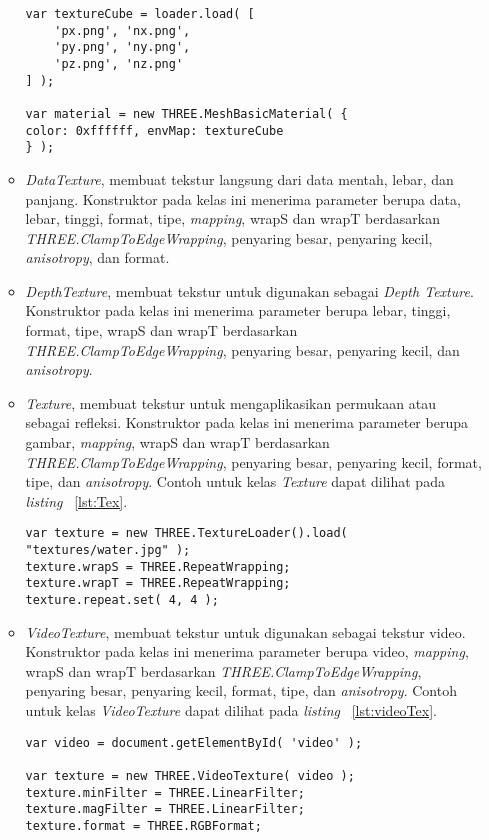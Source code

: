 \begin{itemize}
\begin{itemize}
\begin{lstlisting}[caption={Contoh penggunaan kelas {\it CubeTexture}.}, label={lst:cubeTex},captionpos=b]
var textureCube = loader.load( [
	'px.png', 'nx.png',
	'py.png', 'ny.png',
	'pz.png', 'nz.png'
] );

var material = new THREE.MeshBasicMaterial( { 
color: 0xffffff, envMap: textureCube 
} );
\end{lstlisting}
		\item{\it DataTexture}, membuat tekstur langsung dari data mentah, lebar, dan panjang. Konstruktor pada kelas ini menerima parameter berupa data, lebar, tinggi, format, tipe, {\it mapping}, wrapS dan wrapT berdasarkan {\it THREE.ClampToEdgeWrapping}, penyaring besar, penyaring kecil, {\it anisotropy}, dan format.
		\item{\it DepthTexture}, membuat tekstur untuk digunakan sebagai {\it Depth Texture}. Konstruktor pada kelas ini menerima parameter berupa lebar, tinggi, format, tipe, wrapS dan wrapT berdasarkan {\it THREE.ClampToEdgeWrapping}, penyaring besar, penyaring kecil, dan {\it anisotropy}.
		\item{\it Texture}, membuat tekstur untuk mengaplikasikan permukaan atau sebagai refleksi. Konstruktor pada kelas ini menerima parameter berupa gambar, {\it mapping},  wrapS dan wrapT berdasarkan {\it THREE.ClampToEdgeWrapping}, penyaring besar, penyaring kecil, format, tipe, dan {\it anisotropy}. Contoh untuk kelas {\it Texture} dapat dilihat pada {\it listing} ~\ref{lst:Tex}.
\begin{lstlisting}[caption={Contoh penggunaan kelas {\it Texture}.}, label={lst:Tex},captionpos=b]
var texture = new THREE.TextureLoader().load( "textures/water.jpg" );
texture.wrapS = THREE.RepeatWrapping;
texture.wrapT = THREE.RepeatWrapping;
texture.repeat.set( 4, 4 );
\end{lstlisting}
		\item{\it VideoTexture}, membuat tekstur untuk digunakan sebagai tekstur video. Konstruktor pada kelas ini menerima parameter berupa video, {\it mapping},  wrapS dan wrapT berdasarkan {\it THREE.ClampToEdgeWrapping}, penyaring besar, penyaring kecil, format, tipe, dan {\it anisotropy}. Contoh untuk kelas {\it VideoTexture} dapat dilihat pada {\it listing} ~\ref{lst:videoTex}.
\begin{lstlisting}[caption={Contoh penggunaan kelas {\it VideoTexture}.}, label={lst:videoTex},captionpos=b]
var video = document.getElementById( 'video' );

var texture = new THREE.VideoTexture( video );
texture.minFilter = THREE.LinearFilter;
texture.magFilter = THREE.LinearFilter;
texture.format = THREE.RGBFormat;
\end{lstlisting}
	\end{itemize}

\end{itemize}


